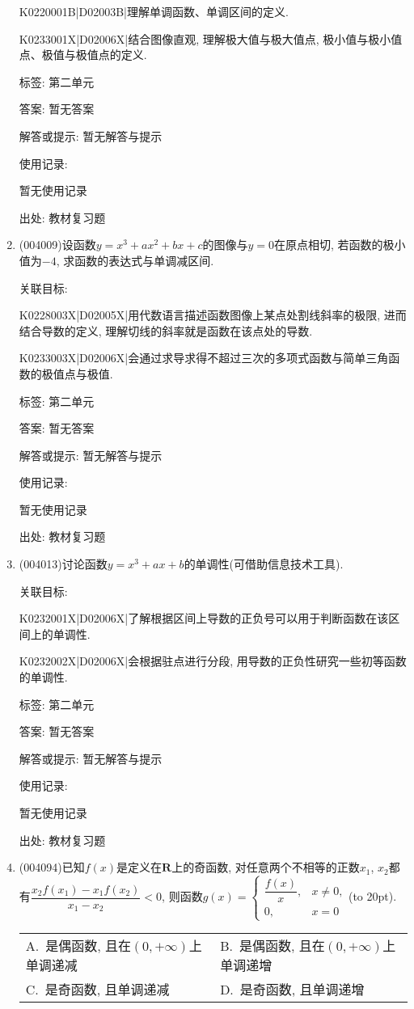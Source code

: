 \documentclass[10pt,a4paper]{article}
\newcommand{\bracket}[1]{(\hbox to #1pt{})}
\newcommand{\twoch}[4]{\par\begin{tabular}{p{.46\textwidth}p{.46\textwidth}}
A.~#1& B.~#2\\
C.~#3& D.~#4
\end{tabular}}
\begin{document}
\begin{enumerate}[1.]
K0220001B|D02003B|理解单调函数、单调区间的定义.

K0233001X|D02006X|结合图像直观, 理解极大值与极大值点, 极小值与极小值点、极值与极值点的定义.



标签: 第二单元

答案: 暂无答案

解答或提示: 暂无解答与提示

使用记录:

暂无使用记录


出处: 教材复习题
\item { (004009)}设函数$y=x^3+ax^2+bx+c$的图像与$y=0$在原点相切, 若函数的极小值为$-4$, 求函数的表达式与单调减区间.


关联目标:

K0228003X|D02005X|用代数语言描述函数图像上某点处割线斜率的极限, 进而结合导数的定义, 理解切线的斜率就是函数在该点处的导数.

K0233003X|D02006X|会通过求导求得不超过三次的多项式函数与简单三角函数的极值点与极值.



标签: 第二单元

答案: 暂无答案

解答或提示: 暂无解答与提示

使用记录:

暂无使用记录


出处: 教材复习题
\item { (004013)}讨论函数$y=x^3+ax+b$的单调性(可借助信息技术工具).


关联目标:

K0232001X|D02006X|了解根据区间上导数的正负号可以用于判断函数在该区间上的单调性.

K0232002X|D02006X|会根据驻点进行分段, 用导数的正负性研究一些初等函数的单调性.



标签: 第二单元

答案: 暂无答案

解答或提示: 暂无解答与提示

使用记录:

暂无使用记录


出处: 教材复习题
\item { (004094)}已知$f(x)$是定义在$\mathbf{R}$上的奇函数, 对任意两个不相等的正数$x_1$, $x_2$都有$\dfrac{x_2f(x_1)-x_1f(x_2)}{x_1-x_2}<0$, 则函数$g(x)=\begin{cases} \dfrac{f(x)}x, &x\ne 0, \\ 0, & x=0 \end{cases}$\bracket{20}.
\twoch{是偶函数, 且在$(0,+\infty)$上单调递减}{是偶函数, 且在$(0,+\infty)$上单调递增}{是奇函数, 且单调递减}{是奇函数, 且单调递增}



\end{enumerate}
\end{document}
